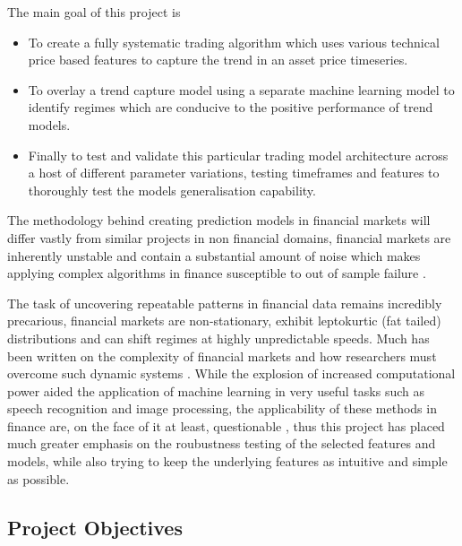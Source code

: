 \documentclass[11pt]{article}
\begin{document}
The main goal of this project is 
\begin{itemize}
\item To create a  fully systematic trading algorithm which uses various technical price based features to capture the trend in an asset price timeseries. 
\item To overlay a trend capture model using a separate machine learning model to identify regimes which are conducive to the positive performance of trend models.
\item Finally to test and validate this particular trading model architecture across a host of different parameter variations, testing timeframes and features to thoroughly test the models generalisation capability. 
\end{itemize}
The methodology behind creating prediction models in financial markets will differ vastly from similar projects in non financial domains, financial markets are inherently unstable and contain a substantial amount of noise which makes applying complex algorithms in finance susceptible to out of sample failure \cite{LopezdePrado2018}.
\par
The task of uncovering repeatable patterns in financial data remains incredibly precarious, financial markets are non-stationary, exhibit leptokurtic (fat tailed) distributions and can shift regimes at highly unpredictable speeds.
Much has been written on the complexity of financial markets and how researchers must overcome such dynamic systems \cite{Lebaron1994}. While the explosion of increased computational power aided the application of machine learning in very useful tasks such as speech recognition and image processing, the applicability of these methods in finance are, on the face of it at least, questionable \cite{Bailey2013}, thus this project has placed much greater emphasis on the roubustness testing of the selected features and models, while also trying to keep the underlying features as intuitive and simple as possible.
\par

\subsection{Project Objectives}
\end{document}
